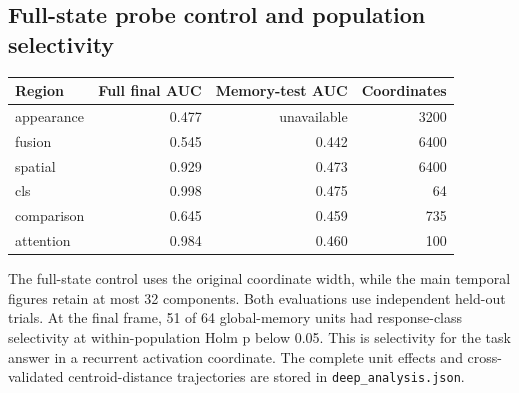 \documentclass[11pt]{article}
\begin{document}
\subsection{Full-state probe control and population selectivity}
\begin{center}\begin{tabular}{lrrr}\toprule Region & Full final AUC & Memory-test AUC & Coordinates\\\midrule
appearance & 0.477 & unavailable & 3200\\
fusion & 0.545 & 0.442 & 6400\\
spatial & 0.929 & 0.473 & 6400\\
cls & 0.998 & 0.475 & 64\\
comparison & 0.645 & 0.459 & 735\\
attention & 0.984 & 0.460 & 100\\
\bottomrule\end{tabular}\end{center}
The full-state control uses the original coordinate width, while the main temporal figures retain at most 32 components. Both evaluations use independent held-out trials. At the final frame, 51 of 64 global-memory units had response-class selectivity at within-population Holm p below 0.05. This is selectivity for the task answer in a recurrent activation coordinate. The complete unit effects and cross-validated centroid-distance trajectories are stored in \texttt{deep\_analysis.json}.
\end{document}
